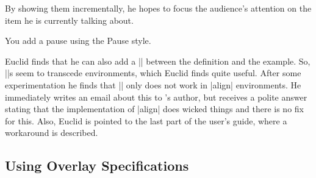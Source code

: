 By showing them incrementally, he
hopes to focus the audience's attention on the item he is currently
talking about.

\lyxnote
You add a pause using the Pause style.

Euclid finds that he can also add a |\pause| between the definition
and the example. So, |\pause|s seem to transcede environments, which
Euclid finds quite useful. After some experimentation he finds that
|\pause| only does not work in |align| environments. He immediately
writes an email about this to \beamer's author, but receives a polite
answer stating that the implementation of |align| does wicked things
and there is no fix for this. Also, Euclid is pointed to the last part
of the user's guide, where a workaround is described. 


\subsection{Using Overlay Specifications}

